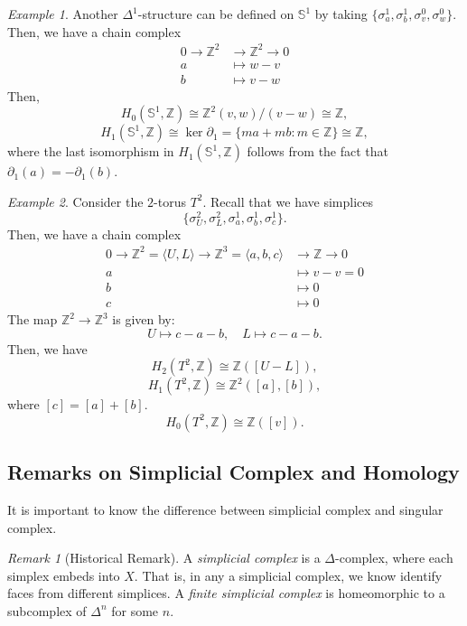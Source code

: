 \documentclass[a4paper]{report}
\theoremstyle{definition}
\theoremstyle{remark}
\newtheorem{remark}{Remark}
\theoremstyle{proposition}
\theoremstyle{conjecture}
\theoremstyle{lemma}
\theoremstyle{corollary}
\theoremstyle{exercise}
\newtheorem{example}{Example}
\begin{document}
\begin{example}
    Another $\Delta^1$-structure can be defined on $\mathbb{S}^1$ by taking 
    $\lbrace \sigma_a^1, \sigma_b^1, \sigma_v^0, \sigma^0_w\rbrace$.
    Then, we have a chain complex 
    \begin{align*}
        0 \longrightarrow \mathbb{Z}^2 &\longrightarrow \mathbb{Z}^2 \longrightarrow 0\\ 
        a &\longmapsto w - v\\ 
        b &\longmapsto v-w
    \end{align*}
    Then, 
    $$H_0(\mathbb{S}^1,\mathbb{Z}) \cong \mathbb{Z}^2(v,w)/(v-w) \cong \mathbb{Z},$$
    $$H_1(\mathbb{S}^1,\mathbb{Z}) \cong \ker \partial_1 = \lbrace ma + mb : m \in \mathbb{Z}\rbrace \cong \mathbb{Z},$$
    where the last isomorphism in $H_1(\mathbb{S}^1,\mathbb{Z})$ follows from the fact that 
    $\partial_1(a) = - \partial_1(b)$.
\end{example}

\begin{example}
    Consider the $2$-torus $T^2$. Recall that we have simplices 
    $$\lbrace \sigma_U^2, \sigma_L^2, \sigma_a^1, \sigma_b^1, \sigma_c^1\rbrace.$$
    Then, we have a chain complex 
    \begin{align*}
        0 \longrightarrow \mathbb{Z}^2 = \langle U,L\rangle \longrightarrow \mathbb{Z}^3 = \langle a,b,c\rangle&\longrightarrow \mathbb{Z} \longrightarrow 0\\
        a &\longmapsto v-v = 0\\ 
        b &\longmapsto 0\\
        c & \longmapsto 0
    \end{align*}
    The map $\mathbb{Z}^2 \to \mathbb{Z}^3$ is given by:
    $$U \longmapsto c -a - b,\quad L \longmapsto c-a-b.$$
    Then, we have 
    $$H_2(T^2,\mathbb{Z}) \cong \mathbb{Z}([U-L]),$$
    $$H_1(T^2,\mathbb{Z}) \cong \mathbb{Z}^2([a],[b]),$$
    where $[c] = [a] + [b]$.
    $$H_0(T^2,\mathbb{Z}) \cong \mathbb{Z}([v]).$$
\end{example}

\subsection{Remarks on Simplicial Complex and Homology}

It is important to know the difference between simplicial complex and singular 
complex.

\begin{remark}[Historical Remark]
    A \emph{simplicial complex} is a $\Delta$-complex, where each simplex embeds into 
    $X$. That is, in any a simplicial complex, we know identify faces from different 
    simplices. A \emph{finite simplicial complex} is homeomorphic to a subcomplex 
    of $\Delta^n$ for some $n$.
\end{remark}
\end{document}
